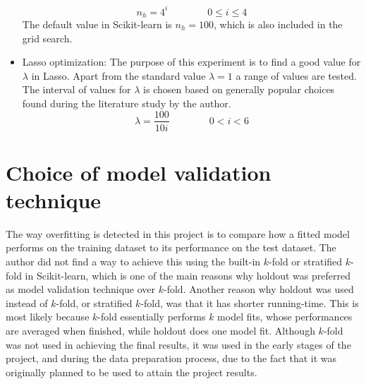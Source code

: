 \begin{itemize}
			\begin{equation}
				n_h = 4^i \qquad \qquad 0 \leq i \leq 4
			\end{equation}
			The default value in Scikit-learn is $n_h = 100$, which is also included in the grid search.
		\item{Lasso optimization: } The purpose of this experiment is to find a good value for $\lambda$ in Lasso. Apart from the standard value $\lambda = 1$ a range of values are tested. The interval of values for $\lambda$ is chosen based on generally popular choices found during the literature study by the author.
			\begin{equation}
				\lambda = \frac{100}{10i} \qquad \qquad 0 < i < 6
			\end{equation} 
	\end{itemize}

\section{Choice of model validation technique}


The way overfitting is detected in this project is to compare how a fitted model performs on the training dataset to its performance on the test dataset. The author did not find a way to achieve this using the built-in $k$-fold or stratified $k$-fold in Scikit-learn, which is one of the main reasons why holdout was preferred as model validation technique over $k$-fold. Another reason why holdout was used instead of $k$-fold, or stratified $k$-fold, was that it has shorter running-time. This is most likely because $k$-fold essentially performs $k$ model fits, whose performances are averaged when finished, while holdout does one model fit. Although $k$-fold was not used in achieving the final results, it was used in the early stages of the project, and during the data preparation process, due to the fact that it was originally planned to be used to attain the project results. 

